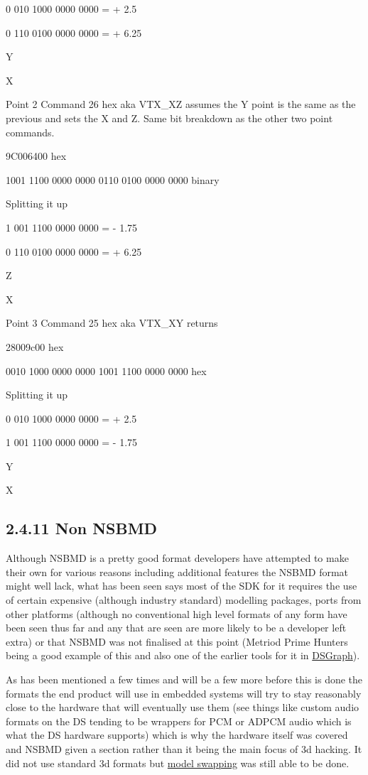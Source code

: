 \documentclass[
]{book}
\begin{document}
0 010 1000 0000 0000 = + 2.5

0 110 0100 0000 0000 = + 6.25

Y

X

Point 2 Command 26 hex aka VTX\_XZ assumes the Y point is the same as the previous and sets the X and Z. Same bit breakdown as the other two point commands.

9C006400 hex

1001 1100 0000 0000 0110 0100 0000 0000 binary

Splitting it up

1 001 1100 0000 0000 = - 1.75

0 110 0100 0000 0000 = + 6.25

Z

X

Point 3 Command 25 hex aka VTX\_XY returns

28009c00 hex

0010 1000 0000 0000 1001 1100 0000 0000 hex

Splitting it up

0 010 1000 0000 0000 = + 2.5

1 001 1100 0000 0000 = - 1.75

Y

X

\hypertarget{non-nsbmd}{%
\subsection{2.4.11 Non NSBMD}\label{non-nsbmd}}

Although NSBMD is a pretty good format developers have attempted to make their own for various reasons including additional features the NSBMD format might well lack, what has been seen says most of the SDK for it requires the use of certain expensive (although industry standard) modelling packages, ports from other platforms (although no conventional high level formats of any form have been seen thus far and any that are seen are more likely to be a developer left extra) or that NSBMD was not finalised at this point (Metriod Prime Hunters being a good example of this and also one of the earlier tools for it in \href{http://filetrip.net/nds-downloads/utilities/download-dsgraph-10-f29517.html}{DSGraph}).

As has been mentioned a few times and will be a few more before this is done the formats the end product will use in embedded systems will try to stay reasonably close to the hardware that will eventually use them (see things like custom audio formats on the DS tending to be wrappers for PCM or ADPCM audio which is what the DS hardware supports) which is why the hardware itself was covered and NSBMD given a section rather than it being the main focus of 3d hacking. It did not use standard 3d formats but \href{http://gbatemp.net/topic/109587-model-swapping-in-soma-bringer/}{model swapping} was still able to be done.
\end{document}
